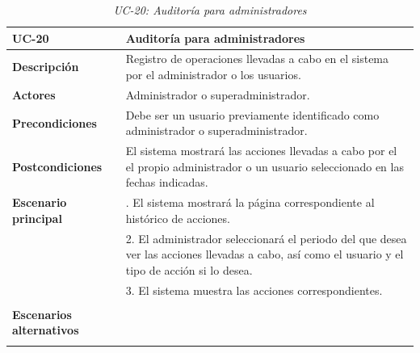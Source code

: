 \begin{table}
  \begin{center}
    \begin{tabularx}{16.4cm}{|l|X|}
      \hline
      \textbf{UC-20} & \textbf{Auditoría para administradores}\\
      \hline
      \textbf{Descripción} & Registro de operaciones llevadas a cabo en el sistema por el administrador o los usuarios.\\
      \hline
      \textbf{Actores} & Administrador o superadministrador.\\
      \hline
      \textbf{Precondiciones} & Debe ser un usuario previamente identificado como administrador o superadministrador.\\
      \hline
      \textbf{Postcondiciones} & El sistema mostrará las acciones llevadas a cabo por el el propio administrador o un usuario seleccionado en las fechas indicadas.\\
      \hline
      \textbf{Escenario principal} & \smallskip 1. El sistema mostrará la página correspondiente al histórico de acciones.\\
      & 2. El administrador seleccionará el periodo del que desea ver las acciones llevadas a cabo, así como el usuario y el tipo de acción si lo desea.\\
      & 3. El sistema muestra las acciones correspondientes.\\
      & \\
      \hline
      \textbf{Escenarios alternativos} & \\
      & \\
      \hline
    \end{tabularx}
    \caption{\textit{UC-20: Auditoría para administradores}}
    \label{tab:CU-auditorias-admin}
  \end{center}
\end{table}


